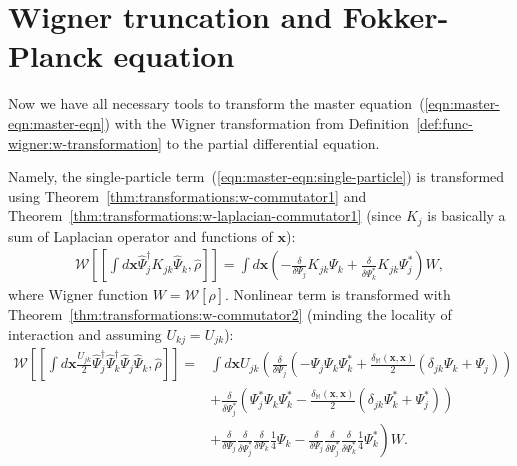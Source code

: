\documentclass[12pt,aip,jmp,amssymb,amsmath]{revtex4-1}
\begin{document}
\section{Wigner truncation and Fokker-Planck equation}

Now we have all necessary tools to transform the master equation~(\ref{eqn:master-eqn:master-eqn}) with the Wigner transformation from Definition~\ref{def:func-wigner:w-transformation} to the partial differential equation.

Namely, the single-particle term~(\ref{eqn:master-eqn:single-particle}) is transformed using Theorem~\ref{thm:transformations:w-commutator1} and Theorem~\ref{thm:transformations:w-laplacian-commutator1} (since $K_j$ is basically a sum of Laplacian operator and functions of $\boldsymbol{x}$):
\begin{equation}\begin{split}
    \mathcal{W} \left[ [ \int d\boldsymbol{x} \hat{\Psi}_j^\dagger K_{jk} \hat{\Psi}_k, \hat{\rho} ] \right]
    = \int d\boldsymbol{x} \left(
            - \frac{\delta}{\delta \Psi_j} K_{jk} \Psi_k
            + \frac{\delta}{\delta \Psi_k^*} K_{jk} \Psi_j^*
        \right)
        W,
\end{split}\end{equation}
where Wigner function $W = \mathcal{W}[\hat{\rho}]$.
Nonlinear term is transformed with Theorem~\ref{thm:transformations:w-commutator2} (minding the locality of interaction and assuming $U_{kj} = U_{jk}$):
\begin{equation}\begin{split}
    \mathcal{W} \left[
        [
            \int d\boldsymbol{x} \frac{U_{jk}}{2}
                \hat{\Psi}_j^\dagger \hat{\Psi}_k^\dagger \hat{\Psi}_j \hat{\Psi}_k,
            \hat{\rho}
        ]
    \right]
    = & \int d\boldsymbol{x} U_{jk} \left(
        \frac{\delta}{\delta \Psi_j} \left(
            - \Psi_j \Psi_k \Psi_k^*
            + \frac{\delta_{\mathbb{M}}(\boldsymbol{x}, \boldsymbol{x})}{2} ( \delta_{jk} \Psi_k + \Psi_j )
        \right) \right. \\
    &   \left. + \frac{\delta}{\delta \Psi_j^*} \left(
            \Psi_j^* \Psi_k \Psi_k^*
            - \frac{\delta_{\mathbb{M}}(\boldsymbol{x}, \boldsymbol{x})}{2} ( \delta_{jk} \Psi_k^* + \Psi_j^* )
        \right) \right. \\
    &   \left.
            + \frac{\delta}{\delta \Psi_j}
            \frac{\delta}{\delta \Psi_j^*}
            \frac{\delta}{\delta \Psi_k}
            \frac{1}{4} \Psi_k
            - \frac{\delta}{\delta \Psi_j}
            \frac{\delta}{\delta \Psi_j^*}
            \frac{\delta}{\delta \Psi_k^*}
            \frac{1}{4} \Psi_k^*
        \right) W.
\end{split}\end{equation}
\end{document}

